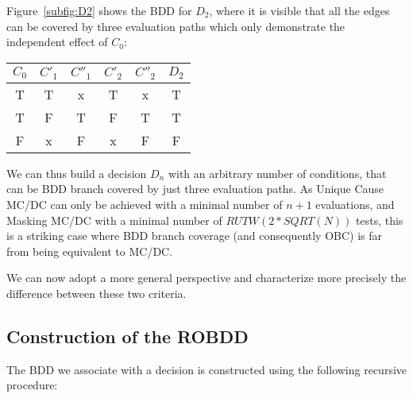 \documentclass[a4paper,12pt,twoside]{article}
\begin{document}
Figure~\ref{subfig:D2} shows the BDD for $D_{2}$, where it is visible
that all the edges can be covered by three evaluation paths which only
demonstrate the independent effect of $C_{0}$:

\begin{center}
\begin{tabular}{|c|c|c|c|c||c|}
\hline
$C_{0}$   & $C'_{1}$   & $C''_{1}$   & $C'_{2}$   & $C''_{2}$   & $D_{2}$ \\ \hline
T      & T       & x        & T       & x        & T     \\ \hline
T      & F       & T        & F       & T        & T     \\ \hline
F      & x       & F        & x       & F        & F     \\ \hline
\end{tabular}
\end{center}

We can thus build a decision $D_{n}$ with an arbitrary number of
conditions, that can be BDD branch covered by just three evaluation
paths. As Unique Cause MC/DC can only be achieved with a minimal
number of $n+1$ evaluations, and Masking MC/DC with a minimal number
of $RUTW(2*SQRT(N))$ tests, this is a striking case where BDD branch
coverage (and consequently OBC) is far from being equivalent to MC/DC.

We can now adopt a more general perspective and characterize more
precisely the difference between these two criteria.

\subsection{Construction of the ROBDD}

The BDD we associate with a decision is constructed using the following
recursive procedure:
\end{document}
